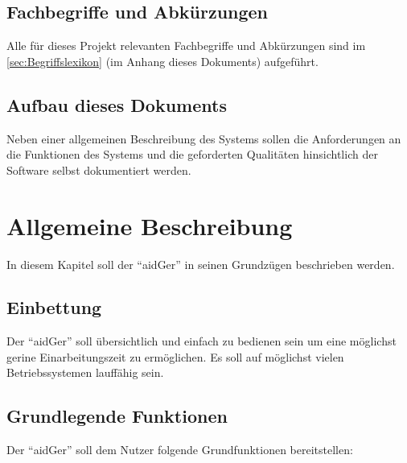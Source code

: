 \documentclass[oneside,german,oneside]{scrbook}
\begin{document}
    \subsection{Fachbegriffe und Abk\"urzungen}\label{sec:Fachbegriffe}

        Alle f\"ur dieses Projekt relevanten Fachbegriffe und 
        Abk\"urzungen sind im \ref{sec:Begriffslexikon} (im Anhang 
        dieses Dokuments) aufgef\"uhrt.

    \subsection{Aufbau dieses Dokuments}\label{sec:Aufbau}

        Neben einer allgemeinen Beschreibung des Systems sollen
        die Anforderungen an die Funktionen des Systems und die geforderten
        Qualit\"aten hinsichtlich der Software selbst dokumentiert werden.


    \pagebreak

\section{Allgemeine Beschreibung}\label{sec:AllgemeineBeschreibung}

    In diesem Kapitel soll der ``aidGer'' in seinen Grundz\"ugen beschrieben
    werden.

    \subsection{Einbettung}\label{sec:Einbettung}
    

        Der ``aidGer'' soll übersichtlich und einfach zu bedienen sein 
        um eine möglichst gerine Einarbeitungszeit zu ermöglichen. Es soll
        auf möglichst vielen Betriebssystemen lauffähig sein.

    \subsection{Grundlegende Funktionen}\label{sec:GrundlegendeFunktionen}

        Der ``aidGer'' soll dem Nutzer folgende Grundfunktionen
        bereitstellen:
\end{document}
